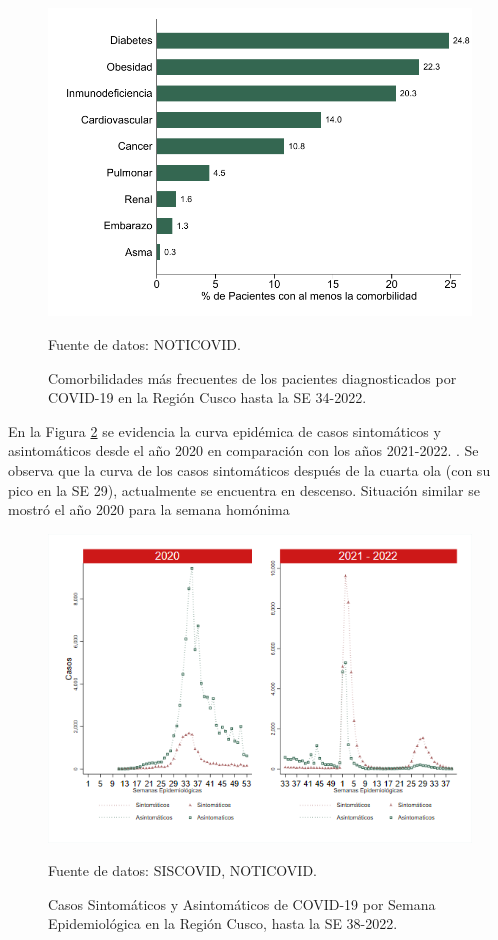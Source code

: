 \documentclass[12pt,a4paper,openany]{book}
\begin{document}
	\begin{figure}[h]
				\caption{Comorbilidades más frecuentes de los pacientes diagnosticados por COVID-19 en la Región Cusco hasta la SE 34-2022. }\label{fig:comorbilidades}
		\begin{center}
			\includegraphics[width=0.65\linewidth]{../figuras/figura_comorbilidad.pdf}
		\end{center}
		{\footnotesize {Fuente de datos: NOTICOVID.}}
	\end{figure}
	\clearpage
	En la Figura \ref{fig:sintomaticos_asintomati} se evidencia la curva epidémica de casos sintomáticos y asintomáticos desde el año 2020 en comparación con los años 2021-2022. . Se observa que la curva de los casos sintomáticos
	después de la cuarta ola (con su pico en la SE 29), actualmente se encuentra en descenso. Situación similar se mostró el año 2020 para la semana homónima
	
	\begin{figure}[h]
		\caption{Casos Sintomáticos y Asintomáticos de COVID-19 por Semana Epidemiológica en la Región Cusco, hasta la SE 38-2022.  }\label{fig:sintomaticos_asintomati}
		
		\begin{center}
			\includegraphics[width=0.95\linewidth]{../figuras/sintomaticos_20_21_22.png}
		\end{center}
		{\footnotesize {Fuente de datos: SISCOVID, NOTICOVID.}}
	\end{figure}
	\clearpage
	
\end{document}
